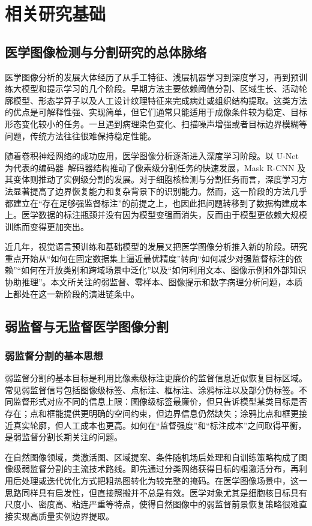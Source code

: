 \chapter{相关研究基础}

\section{医学图像检测与分割研究的总体脉络}
医学图像分析的发展大体经历了从手工特征、浅层机器学习到深度学习，再到预训练大模型和提示学习的几个阶段。早期方法主要依赖阈值分割、区域生长、活动轮廓模型、形态学算子以及人工设计纹理特征来完成病灶或组织结构提取。这类方法的优点是可解释性强、实现简单，但它们通常只能适用于成像条件较为稳定、目标形态变化较小的任务。一旦遇到病理染色变化、扫描噪声增强或者目标边界模糊等问题，传统方法往往很难保持稳定性能。

随着卷积神经网络的成功应用，医学图像分析逐渐进入深度学习阶段。以 U-Net 为代表的编码器--解码器结构推动了像素级分割任务的快速发展，Mask R-CNN 及其变体则推动了实例级分割的发展。对于细胞核检测与分割任务而言，深度学习方法显著提高了边界恢复能力和复杂背景下的识别能力。然而，这一阶段的方法几乎都建立在“存在足够强监督标注”的前提之上，也因此把问题转移到了数据构建成本上。医学数据的标注瓶颈并没有因为模型变强而消失，反而由于模型更依赖大规模训练而变得更加突出。

近几年，视觉语言预训练和基础模型的发展又把医学图像分析推入新的阶段。研究重点开始从“如何在固定数据集上逼近最优精度”转向“如何减少对强监督标注的依赖”“如何在开放类别和跨域场景中泛化”以及“如何利用文本、图像示例和外部知识协助推理”。本文所关注的弱监督、零样本、图像提示和数字病理分析问题，本质上都处在这一新阶段的演进链条中。

\section{弱监督与无监督医学图像分割}

\subsection{弱监督分割的基本思想}
弱监督分割的基本目标是利用比像素级标注更廉价的监督信息近似恢复目标区域。常见弱监督信号包括图像级标签、点标注、框标注、涂鸦标注以及部分伪标签。不同监督形式对应不同的信息上限：图像级标签最廉价，但只告诉模型某类目标是否存在；点和框能提供更明确的空间约束，但边界信息仍然缺失；涂鸦比点和框更接近真实轮廓，但人工成本也更高。如何在“监督强度”和“标注成本”之间取得平衡，是弱监督分割长期关注的问题。

在自然图像领域，类激活图、区域提案、条件随机场后处理和自训练策略构成了图像级弱监督分割的主流技术路线。即先通过分类网络获得目标的粗激活分布，再利用后处理或迭代优化方式把粗热图转化为较完整的掩码。在医学图像场景中，这一思路同样具有启发性，但直接照搬并不总是有效。医学对象尤其是细胞核目标具有尺度小、密度高、粘连严重等特点，使得自然图像中的弱监督前景恢复策略很难直接实现高质量实例边界提取。

